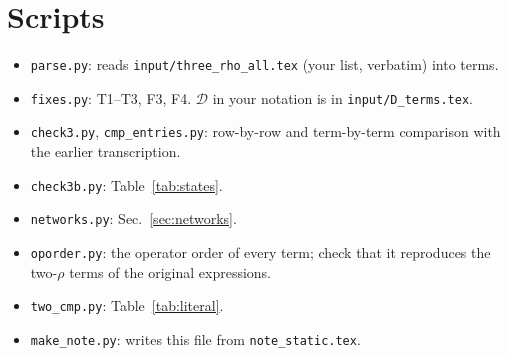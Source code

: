 \documentclass[10pt]{article}
\numberwithin{equation}{section}
\begin{document}
\appendix
\section{Scripts}
\begin{itemize}
\item \texttt{parse.py}: reads \texttt{input/three\_rho\_all.tex} (your list, verbatim) into terms.
\item \texttt{fixes.py}: T1--T3, F3, F4. $\mathcal D$ in your notation is in \texttt{input/D\_terms.tex}.
\item \texttt{check3.py}, \texttt{cmp\_entries.py}: row-by-row and term-by-term comparison with the earlier transcription.
\item \texttt{check3b.py}: Table~\ref{tab:states}.
\item \texttt{networks.py}: Sec.~\ref{sec:networks}.
\item \texttt{oporder.py}: the operator order of every term; check that it reproduces the two-$\rho$ terms of the original expressions.
\item \texttt{two\_cmp.py}: Table~\ref{tab:literal}.
\item \texttt{make\_note.py}: writes this file from \texttt{note\_static.tex}.
\end{itemize}
\end{document}
